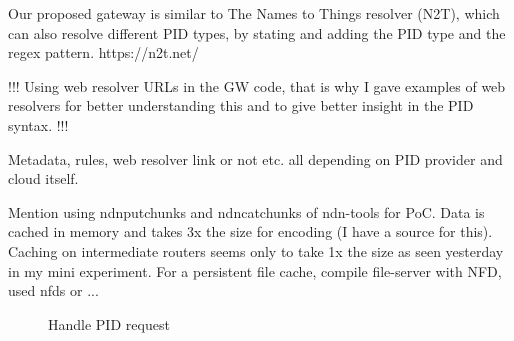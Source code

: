 Our proposed gateway is similar to The Names to Things resolver (N2T), which can also resolve different PID types, by stating and adding the PID type and the regex pattern. https://n2t.net/

!!! Using web resolver URLs in the GW code, that is why I gave examples of web resolvers for better understanding this and to give better insight in the PID syntax. !!!

Metadata, rules, web resolver link or not etc. all depending on PID provider and cloud itself.

Mention using ndnputchunks and ndncatchunks of ndn-tools for PoC. Data is cached in memory and takes 3x the size for encoding (I have a source for this). Caching on intermediate routers seems only to take 1x the size as seen yesterday in my mini experiment. For a persistent file cache, compile file-server with NFD, used nfds or ...












\begin{figure}[H]
    \centering
    \caption{Handle PID request\label{fig:seq_pid}}

\end{figure}

